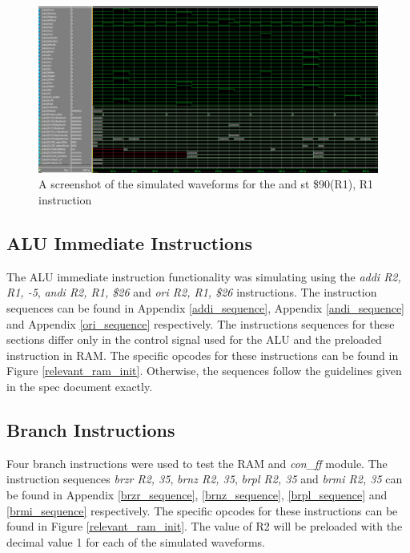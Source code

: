 \documentclass{article}
\begin{document}
            \begin{figure}[h!]
                \begin{center}
                    \includegraphics[width=15cm]{st_case_1_wave.png}
                    \caption{A screenshot of the simulated waveforms for the and st \$90(R1), R1 instruction}
                \end{center}
            \end{figure}
            

    \subsection{ALU Immediate Instructions}
        The ALU immediate instruction functionality was simulating using the \emph{addi R2, R1, -5}, \emph{andi R2, R1, \$26} and \emph{ori R2, R1, \$26} instructions. The instruction sequences can be found in Appendix \ref{addi_sequence}, Appendix \ref{andi_sequence} and Appendix \ref{ori_sequence} respectively. The instructions sequences for these sections differ only in the control signal used for the ALU and the preloaded instruction in RAM. The specific opcodes for these instructions can be found in Figure \ref{relevant_ram_init}. Otherwise, the sequences follow the guidelines given in the spec document exactly.

    \subsection{Branch Instructions}
        Four branch instructions were used to test the RAM and \emph{con_ff} module. The instruction sequences \emph{brzr R2, 35}, \emph{brnz R2, 35}, \emph{brpl R2, 35} and \emph{brmi R2, 35} can be found in Appendix \ref{brzr_sequence}, \ref{brnz_sequence}, \ref{brpl_sequence} and \ref{brmi_sequence} respectively. The specific opcodes for these instructions can be found in Figure \ref{relevant_ram_init}. The value of R2 will be preloaded with the decimal value 1 for each of the simulated waveforms. 
\end{document}
